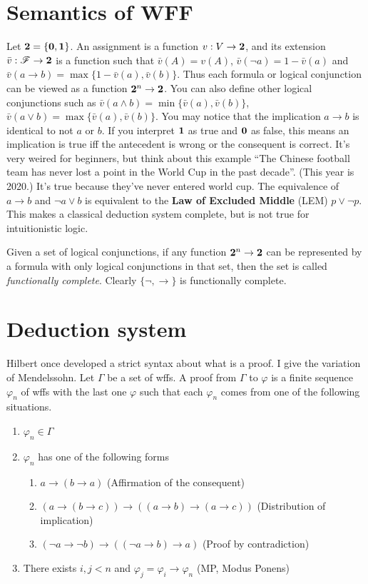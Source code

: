 \section{Semantics of WFF}
Let $\mathbf{2}=\{\mathbf{0},\mathbf{1}\}$. An assignment is a function $v: V\to \mathbf{2}$, and
its extension $\bar{v}:\mathscr{F} \to \mathbf{2}$ is a function such that
$\bar{v}(A)=v(A)$, $\bar{v}(\neg a)=1 - \bar{v}(a)$ and 
$\bar{v}(a\to b)=\max\{1-\bar{v}(a),\bar{v}(b)\}$.
Thus each formula or logical conjunction 
can be viewed as a function $\mathbf{2}^n\to\mathbf{2}$. You can
also define other logical conjunctions such as $\bar{v}(a\wedge b)=
\min\{\bar{v}(a),\bar{v}(b)\}$, $\bar{v}(a\vee b)=
\max\{\bar{v}(a),\bar{v}(b)\}$. You may notice that the implication 
$a\to b$ is identical to not $a$ or $b$. If you interpret $\mathbf{1}$ as
true and $\mathbf{0}$ as false, this means an implication is true iff
the antecedent is wrong or the consequent is correct. It's very
weired for beginners, but think about this example  
``The Chinese football team has never lost a point in the World Cup
in the past decade''. (This year is 2020.) It's true because they've
never entered world cup. The equivalence of $a\to b$ and $\neg a\vee b$
is equivalent to the {\bf Law of Excluded Middle} (LEM) $p\vee\neg p$.
This makes a classical deduction system complete, but is not true
for intuitionistic logic. 

Given a set of logical conjunctions, if any
function $\mathbf{2}^n\to\mathbf{2}$ can be represented by a formula with only
logical conjunctions in that set, then the set is called {\it
functionally complete}. Clearly $\{\neg,\to\}$ is functionally
complete.

\section{Deduction system}
\label{Mendelssohn-system}
Hilbert once developed a strict syntax about what is a proof. I
give the variation of Mendelssohn. Let $\Gamma$ be a set of wffs.
A proof from $\Gamma$ to $\varphi$ is a finite sequence $\varphi_n$ of
wffs with the last one $\varphi$ such that each $\varphi_n$ comes from
one of the following situations.

\begin{enumerate}
    \item $\varphi_n\in\Gamma$
    \item $\varphi_n$ has one of the following forms 
        \begin{enumerate}
            \item $a\to (b\to a)$ (Affirmation of the consequent)
            \item $(a\to(b\to c))\to((a\to b)\to(a\to c))$ (Distribution of implication)
            \item $(\neg a\to\neg b)\to((\neg a\to b)\to a)$ (Proof by contradiction)
        \end{enumerate}
    \item There exists $i,j<n$ and $\varphi_j=\varphi_i\to\varphi_n$ (MP, Modus Ponens)
\end{enumerate}

